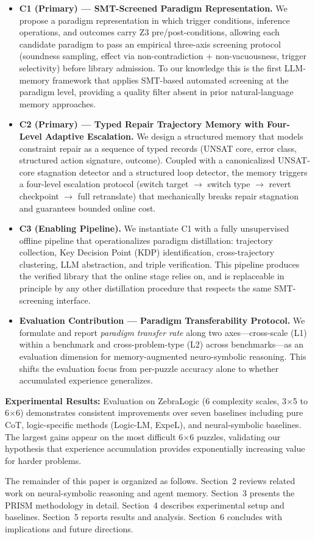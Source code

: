\begin{itemize}
    \item \textbf{C1 (Primary) — SMT-Screened Paradigm Representation.} We propose a paradigm representation in which trigger conditions, inference operations, and outcomes carry Z3 pre/post-conditions, allowing each candidate paradigm to pass an empirical three-axis screening protocol (soundness sampling, effect via non-contradiction + non-vacuousness, trigger selectivity) before library admission. To our knowledge this is the first LLM-memory framework that applies SMT-based automated screening at the paradigm level, providing a quality filter absent in prior natural-language memory approaches.

    \item \textbf{C2 (Primary) — Typed Repair Trajectory Memory with Four-Level Adaptive Escalation.} We design a structured memory that models constraint repair as a sequence of typed records (UNSAT core, error class, structured action signature, outcome). Coupled with a canonicalized UNSAT-core stagnation detector and a structured loop detector, the memory triggers a four-level escalation protocol (switch target $\to$ switch type $\to$ revert checkpoint $\to$ full retranslate) that mechanically breaks repair stagnation and guarantees bounded online cost.

    \item \textbf{C3 (Enabling Pipeline).} We instantiate C1 with a fully unsupervised offline pipeline that operationalizes paradigm distillation: trajectory collection, Key Decision Point (KDP) identification, cross-trajectory clustering, LLM abstraction, and triple verification. This pipeline produces the verified library that the online stage relies on, and is replaceable in principle by any other distillation procedure that respects the same SMT-screening interface.

    \item \textbf{Evaluation Contribution — Paradigm Transferability Protocol.} We formulate and report \textit{paradigm transfer rate} along two axes—cross-scale (L1) within a benchmark and cross-problem-type (L2) across benchmarks—as an evaluation dimension for memory-augmented neuro-symbolic reasoning. This shifts the evaluation focus from per-puzzle accuracy alone to whether accumulated experience generalizes.
\end{itemize}

\textbf{Experimental Results:} Evaluation on ZebraLogic (6 complexity scales, 3$\times$5 to 6$\times$6) demonstrates consistent improvements over seven baselines including pure CoT, logic-specific methods (Logic-LM, ExpeL), and neural-symbolic baselines. The largest gains appear on the most difficult 6$\times$6 puzzles, validating our hypothesis that experience accumulation provides exponentially increasing value for harder problems.

The remainder of this paper is organized as follows. Section~2 reviews related work on neural-symbolic reasoning and agent memory. Section~3 presents the PRISM methodology in detail. Section~4 describes experimental setup and baselines. Section~5 reports results and analysis. Section~6 concludes with implications and future directions.
